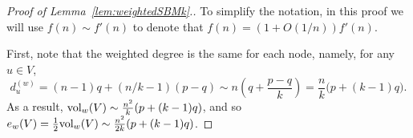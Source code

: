 \documentclass[a4paper,UKenglish,cleveref, autoref, thm-restate,numberwithinsect]{lipics-v2021}
\newcommand{\vol}{{\rm vol}}
\begin{document}

\begin{proof}[Proof of Lemma~\ref{lem:weightedSBMk}.]
To simplify the notation, in this proof we will use $f(n) \sim f'(n)$ to denote that $f(n) = (1+O(1/n)) f'(n)$. 

First, note that the weighted degree is the same for each node, namely, for any $u \in V$, 
$$
d_u^{(w)} = (n-1) q + (n/k-1) (p-q) \sim n \left( q + \frac {p-q}{k} \right) = \frac {n}{k} \Big( p+(k-1)q \Big).
$$
As a result, $\vol_w(V) \sim \frac {n^2}{k} ( p+(k-1)q )$, and so $e_w(V) = \frac {1}{2} \vol_w(V) \sim \frac {n^2}{2k} ( p+(k-1)q )$.


\end{proof}
\end{document}
